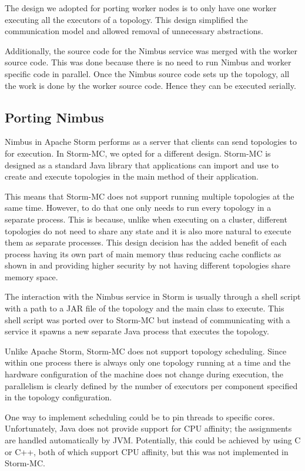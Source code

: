 The design we adopted for porting worker nodes is to only have one worker executing all the executors of a topology. This design simplified the communication model and allowed removal of unnecessary abstractions.

Additionally, the source code for the Nimbus service was merged with the worker source code. This was done because there is no need to run Nimbus and worker specific code in parallel. Once the Nimbus source code sets up the topology, all the work is done by the worker source code. Hence they can be executed serially.

\subsection{Porting Nimbus}

Nimbus in Apache Storm performs as a server that clients can send topologies to for execution. In Storm-MC, we opted for a different design. Storm-MC is designed as a standard Java library that applications can import and use to create and execute topologies in the main method of their application.

This means that Storm-MC does not support running multiple topologies at the same time. However, to do that one only needs to run every topology in a separate process. This is because, unlike when executing on a cluster, different topologies do not need to share any state and it is also more natural to execute them as separate processes. This design decision has the added benefit of each process having its own part of main memory thus reducing cache conflicts as shown in \cite{Chandra:2005:PIC:1042442.1043432} and providing higher security by not having different topologies share memory space.

The interaction with the Nimbus service in Storm is usually through a shell script with a path to a JAR file of the topology and the main class to execute. This shell script was ported over to Storm-MC but instead of communicating with a service it spawns a new separate Java process that executes the topology.

Unlike Apache Storm, Storm-MC does not support topology scheduling. Since within one process there is always only one topology running at a time and the hardware configuration of the machine does not change during execution, the parallelism is clearly defined by the number of executors per component specified in the topology configuration.

One way to implement scheduling could be to pin threads to specific cores. Unfortunately, Java does not provide support for CPU affinity; the assignments are handled automatically by JVM. Potentially, this could be achieved by using C or C++, both of which support CPU affinity, but this was not implemented in Storm-MC.

